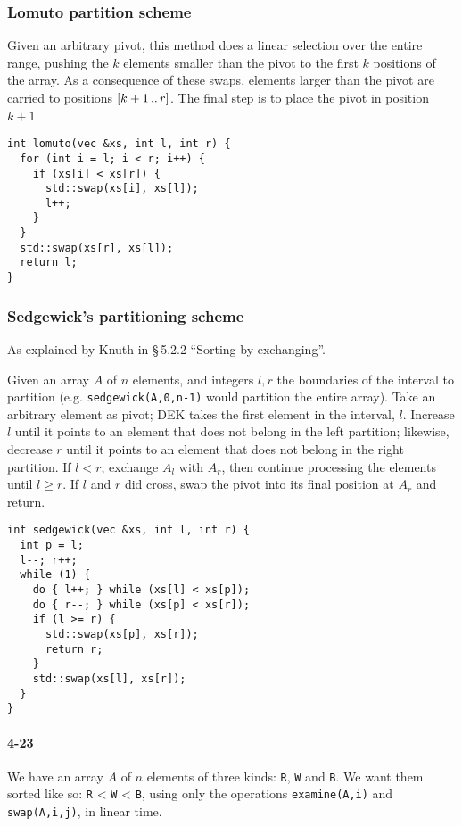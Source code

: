 \documentclass{report}
\newcommand{\ldotsTwo}{%
  \mathinner{{\ldotp}{\ldotp}}%
}
\newcommand{\li}{\lstinline}
\begin{document}
\subsubsection*{Lomuto partition scheme}
Given an arbitrary pivot, this method does a linear selection over the entire range, pushing the $k$ elements smaller than the pivot to the first $k$ positions of the array. As a consequence of these swaps, elements larger than the pivot are carried to positions $[k+1 \ldotsTwo r]$. The final step is to place the pivot in position $k+1$.

\begin{lstlisting}
int lomuto(vec &xs, int l, int r) {
  for (int i = l; i < r; i++) {
    if (xs[i] < xs[r]) {
      std::swap(xs[i], xs[l]);
      l++;
    }
  }
  std::swap(xs[r], xs[l]);
  return l;
}
\end{lstlisting}

\subsubsection*{Sedgewick's partitioning scheme}
As explained by Knuth in \S\,5.2.2 ``Sorting by exchanging''.

Given an array $A$ of $n$ elements, and integers $l, r$ the boundaries of the interval to partition (e.g. \lstinline!sedgewick(A,0,n-1)! would partition the entire array). Take an arbitrary element as pivot; DEK takes the first element in the interval, $l$. Increase $l$ until it points to an element that does not belong in the left partition; likewise, decrease $r$ until it points to an element that does not belong in the right partition. If $l<r$, exchange $A_l$ with $A_r$, then continue processing the elements until $l\geq r$. If $l$ and $r$ did cross, swap the pivot into its final position at $A_r$ and return.

\begin{lstlisting}
int sedgewick(vec &xs, int l, int r) {
  int p = l;
  l--; r++;
  while (1) {
    do { l++; } while (xs[l] < xs[p]);
    do { r--; } while (xs[p] < xs[r]);
    if (l >= r) {
      std::swap(xs[p], xs[r]);
      return r;
    }
    std::swap(xs[l], xs[r]);
  }
}
\end{lstlisting}

\paragraph{4-23} We have an array $A$ of $n$ elements of three kinds: \li!R!, \li!W! and \li!B!. We want them sorted like so: \li!R! < \li!W! < \li!B!, using only the operations \li!examine(A,i)! and \li!swap(A,i,j)!, in linear time.
\end{document}
